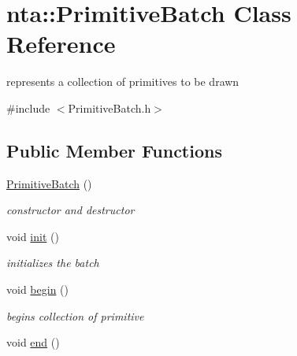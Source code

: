 \hypertarget{classnta_1_1PrimitiveBatch}{}\section{nta\+:\+:Primitive\+Batch Class Reference}
\label{classnta_1_1PrimitiveBatch}


represents a collection of primitives to be drawn  




{\ttfamily \#include $<$Primitive\+Batch.\+h$>$}

\subsection*{Public Member Functions}
\begin{DoxyCompactItemize}
\item 
\mbox{\label{classnta_1_1PrimitiveBatch_a28628a90db31796dd0d1cf770dbe9ff5}} 
\hyperlink{classnta_1_1PrimitiveBatch_a28628a90db31796dd0d1cf770dbe9ff5}{Primitive\+Batch} ()
\begin{DoxyCompactList}\small\item\em constructor and destructor \end{DoxyCompactList}\item 
\mbox{\label{classnta_1_1PrimitiveBatch_a425c70802333e18a6cd019aec145f07b}} 
void \hyperlink{classnta_1_1PrimitiveBatch_a425c70802333e18a6cd019aec145f07b}{init} ()
\begin{DoxyCompactList}\small\item\em initializes the batch \end{DoxyCompactList}\item 
\mbox{\label{classnta_1_1PrimitiveBatch_a589f1ebad11f83187f2ce8f81875fe22}} 
void \hyperlink{classnta_1_1PrimitiveBatch_a589f1ebad11f83187f2ce8f81875fe22}{begin} ()
\begin{DoxyCompactList}\small\item\em begins collection of primitive \end{DoxyCompactList}\item 
\mbox{\label{classnta_1_1PrimitiveBatch_a570927ae1e495ff444d44bd6d19c74ff}} 
void \hyperlink{classnta_1_1PrimitiveBatch_a570927ae1e495ff444d44bd6d19c74ff}{end} ()

\end{DoxyCompactItemize}

